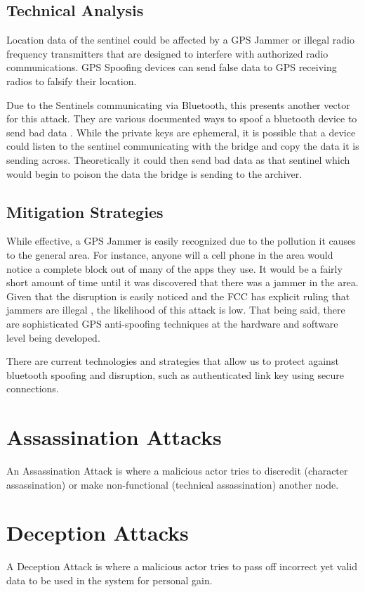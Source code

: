 \documentclass{article}
\begin{document}
\subsection{Technical Analysis}
Location data of the sentinel could be affected by a GPS Jammer or illegal radio frequency transmitters that are designed to interfere with authorized radio communications. GPS Spoofing devices \cite{gps1} can send false data to GPS receiving radios to falsify their location. 

Due to the Sentinels communicating via Bluetooth, this presents another vector for this attack. They are various documented ways to spoof a bluetooth device to send bad data \cite{bluetooth1}. While the private keys are ephemeral, it is possible that a device could listen to the sentinel communicating with the bridge and copy the data it is sending across. Theoretically it could then send bad data as that sentinel which would begin to poison the data the bridge is sending to the archiver. 

\subsection{Mitigation Strategies}
While effective, a GPS Jammer is easily recognized due to the pollution it causes to the general area. For instance, anyone will a cell phone in the area would notice a complete block out of many of the apps they use. It would be a fairly short amount of time until it was discovered that there was a jammer in the area. Given that the disruption is easily noticed and the FCC has explicit ruling that jammers are illegal \cite{fcc1}, the likelihood of this attack is low. That being said, there are sophisticated GPS anti-spoofing techniques at the hardware and software level being developed. \cite{gps1}

There are current technologies and strategies that allow us to protect against bluetooth spoofing and disruption, such as authenticated link key using secure connections. \cite{bluetooth2}

\section{Assassination Attacks}
An Assassination Attack is where a malicious actor tries to discredit (character assassination) or make non-functional (technical assassination) another node.

\section{Deception Attacks}
A Deception Attack is where a malicious actor tries to pass off incorrect yet valid data to be used in the system for personal gain.
\end{document}
